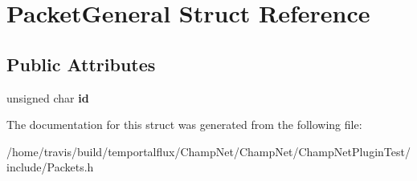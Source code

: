 \hypertarget{struct_packet_general}{\section{Packet\-General Struct Reference}
\label{struct_packet_general}
}
\subsection*{Public Attributes}
\begin{DoxyCompactItemize}
\item 
\hypertarget{struct_packet_general_aac5930add4956e3e3bab8c9a1d170ad8}{unsigned char {\bfseries id}}\label{struct_packet_general_aac5930add4956e3e3bab8c9a1d170ad8}

\end{DoxyCompactItemize}


The documentation for this struct was generated from the following file\-:\begin{DoxyCompactItemize}
\item 
/home/travis/build/temportalflux/\-Champ\-Net/\-Champ\-Net/\-Champ\-Net\-Plugin\-Test/include/Packets.\-h\end{DoxyCompactItemize}
